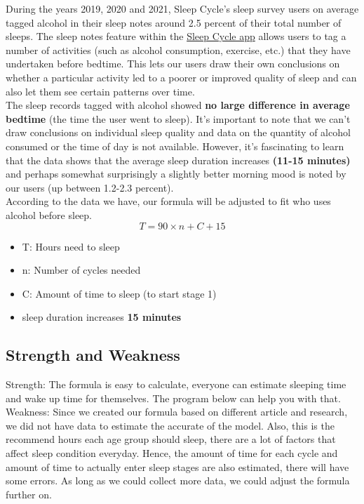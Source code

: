 During the years 2019, 2020 and 2021, Sleep Cycle’s sleep survey users on average tagged alcohol in their sleep notes around 2.5 percent of their total number of sleeps. The sleep notes feature within the \href{https://apps.apple.com/app/id320606217?mt=8}{Sleep Cycle app} allows users to tag a number of activities (such as alcohol consumption, exercise, etc.) that they have undertaken before bedtime. This lets our users draw their own conclusions on whether a particular activity led to a poorer or improved quality of sleep and can also let them see certain patterns over time.\\

The sleep records tagged with alcohol showed \textbf{no large difference in average bedtime} (the time the user went to sleep).  It’s important to note that we can’t draw conclusions on individual sleep quality and data on the quantity of alcohol consumed or the time of day is not available. However, it’s fascinating to learn that the data shows that the average sleep duration increases \textbf{(11-15 minutes)} and perhaps somewhat surprisingly a slightly better morning mood is noted by our users (up between 1.2-2.3 percent).\cite{alcoholeff}\\

According to the data we have, our formula will be adjusted to fit who uses alcohol before sleep.\\
$$
T = 90 \times n + C + 15
$$
\begin{itemize}
    \item T: Hours need to sleep
    \item n: Number of cycles needed
    \item C: Amount of time to sleep (to start stage 1)
    \item sleep duration increases \textbf{15 minutes}
\end{itemize}

\subsection{Strength and Weakness}
Strength: The formula is easy to calculate, everyone can estimate sleeping time and wake up time for themselves. The program below can help you with that.\\

Weakness: Since we created our formula based on different article and research, we did not have data to estimate the accurate of the model. Also, this is the recommend hours each age group should sleep, there are a lot of factors that affect sleep condition everyday. Hence, the amount of time for each cycle and amount of time to actually enter sleep stages are also estimated, there will have some errors. As long as we could collect more data, we could adjust the formula further on.